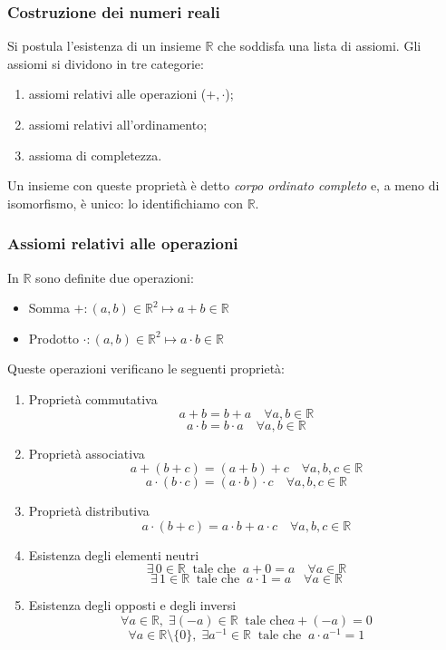 \subsubsection{Costruzione dei numeri reali}
Si postula l’esistenza di un insieme $\mathbb{R}$ che soddisfa una lista di assiomi.
Gli assiomi si dividono in tre categorie:
\begin{enumerate}[label=\Alph*)]
\item assiomi relativi alle operazioni ($+, \cdot$);
\item assiomi relativi all’ordinamento;
\item assioma di completezza.
\end{enumerate}

Un insieme con queste proprietà è detto \emph{corpo ordinato completo} e, a meno di isomorfismo, è unico: lo identifichiamo con $\mathbb{R}$.

\subsubsection{Assiomi relativi alle operazioni}
In $\mathbb{R}$ sono definite due operazioni:
\begin{itemize}
\item Somma \quad $+ : (a, b) \in \mathbb{R}^2 \mapsto a + b \in \mathbb{R}$
\item Prodotto \quad $\cdot : (a, b) \in \mathbb{R}^2 \mapsto a \cdot b \in \mathbb{R}$
\end{itemize}

Queste operazioni verificano le seguenti proprietà:
\begin{enumerate}
  \renewcommand{\labelenumi}{a\theenumi}

  \item Proprietà commutativa
  \[
    a + b = b + a \quad \forall a, b \in \mathbb{R}
  \]
  \[
    a \cdot b = b \cdot a \quad \forall a, b \in \mathbb{R}
  \]

  \item Proprietà associativa
  \[
    a + (b + c) = (a + b) + c \quad \forall a, b, c \in \mathbb{R}
  \]
  \[
    a \cdot (b \cdot c) = (a \cdot b) \cdot c \quad \forall a, b, c \in \mathbb{R}
  \]

  \item Proprietà distributiva
  \[
    a \cdot (b + c) = a \cdot b + a \cdot c \quad \forall a, b, c \in \mathbb{R}
  \]

  \item Esistenza degli elementi neutri
  \[
    \exists\, 0 \in \mathbb{R} \;\; \text{tale che} \;\; a + 0 = a \quad \forall a \in \mathbb{R}
  \]
  \[
    \exists\, 1 \in \mathbb{R} \;\; \text{tale che} \;\; a \cdot 1 = a \quad \forall a \in \mathbb{R}
  \]

  \item Esistenza degli opposti e degli inversi
  \[
    \forall a \in \mathbb{R}, \; \exists (-a) \in \mathbb{R} \;\; \text{tale che} a+(-a) = 0
  \]
  \[
    \forall a \in \mathbb{R}\setminus \{0\}, \; \exists a^{-1} \in \mathbb{R} \;\; \text{tale che} \;\; a \cdot a^{-1} = 1
  \]
\end{enumerate}

